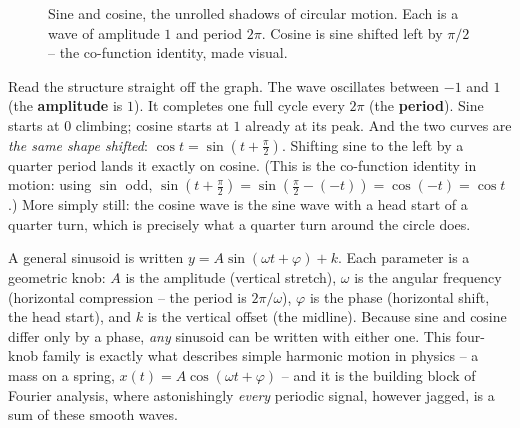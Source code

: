 \begin{figure}[H]
\centering
{}
\caption{Sine and cosine, the unrolled shadows of circular motion. Each is a wave of amplitude $1$ and period $2\pi$. Cosine is sine shifted left by $\pi/2$ -- the co-function identity, made visual.}
\label{ch04:fig-sincos-graph}
\end{figure}

Read the structure straight off the graph. The wave oscillates between $-1$ and $1$ (the \textbf{amplitude} is $1$). It completes one full cycle every $2\pi$ (the \textbf{period}). Sine starts at $0$ climbing; cosine starts at $1$ already at its peak. And the two curves are \emph{the same shape shifted}: $\cos t = \sin(t + \tfrac\pi2)$. Shifting sine to the left by a quarter period lands it exactly on cosine. (This is the co-function identity in motion: using $\sin$ odd, $\sin(t+\tfrac\pi2) = \sin(\tfrac\pi2-(-t)) = \cos(-t) = \cos t$.) More simply still: the cosine wave is the sine wave with a head start of a quarter turn, which is precisely what a quarter turn around the circle does.

\begin{connectionbox}
A general sinusoid is written $y = A\sin(\omega t + \varphi) + k$. Each parameter is a geometric knob: $A$ is the amplitude (vertical stretch), $\omega$ is the angular frequency (horizontal compression -- the period is $2\pi/\omega$), $\varphi$ is the phase (horizontal shift, the head start), and $k$ is the vertical offset (the midline). Because sine and cosine differ only by a phase, \emph{any} sinusoid can be written with either one. This four-knob family is exactly what describes simple harmonic motion in physics -- a mass on a spring, $x(t) = A\cos(\omega t + \varphi)$ -- and it is the building block of Fourier analysis, where astonishingly \emph{every} periodic signal, however jagged, is a sum of these smooth waves.
\end{connectionbox}

